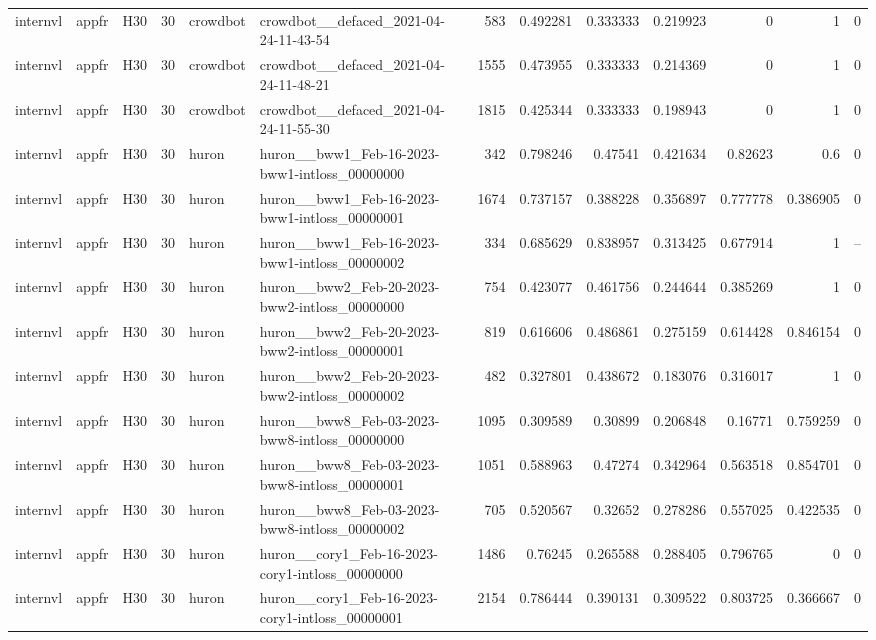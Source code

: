 \begin{longtable}{lllrllrrrrrrr}
internvl & appfr & H30 & 30 & crowdbot & crowdbot\_\_defaced\_2021-04-24-11-43-54 & 583 & 0.492281 & 0.333333 & 0.219923 & 0 & 1 & 0 \\
internvl & appfr & H30 & 30 & crowdbot & crowdbot\_\_defaced\_2021-04-24-11-48-21 & 1555 & 0.473955 & 0.333333 & 0.214369 & 0 & 1 & 0 \\
internvl & appfr & H30 & 30 & crowdbot & crowdbot\_\_defaced\_2021-04-24-11-55-30 & 1815 & 0.425344 & 0.333333 & 0.198943 & 0 & 1 & 0 \\
internvl & appfr & H30 & 30 & huron & huron\_\_bww1\_Feb-16-2023-bww1-intloss\_00000000 & 342 & 0.798246 & 0.47541 & 0.421634 & 0.82623 & 0.6 & 0 \\
internvl & appfr & H30 & 30 & huron & huron\_\_bww1\_Feb-16-2023-bww1-intloss\_00000001 & 1674 & 0.737157 & 0.388228 & 0.356897 & 0.777778 & 0.386905 & 0 \\
internvl & appfr & H30 & 30 & huron & huron\_\_bww1\_Feb-16-2023-bww1-intloss\_00000002 & 334 & 0.685629 & 0.838957 & 0.313425 & 0.677914 & 1 & -- \\
internvl & appfr & H30 & 30 & huron & huron\_\_bww2\_Feb-20-2023-bww2-intloss\_00000000 & 754 & 0.423077 & 0.461756 & 0.244644 & 0.385269 & 1 & 0 \\
internvl & appfr & H30 & 30 & huron & huron\_\_bww2\_Feb-20-2023-bww2-intloss\_00000001 & 819 & 0.616606 & 0.486861 & 0.275159 & 0.614428 & 0.846154 & 0 \\
internvl & appfr & H30 & 30 & huron & huron\_\_bww2\_Feb-20-2023-bww2-intloss\_00000002 & 482 & 0.327801 & 0.438672 & 0.183076 & 0.316017 & 1 & 0 \\
internvl & appfr & H30 & 30 & huron & huron\_\_bww8\_Feb-03-2023-bww8-intloss\_00000000 & 1095 & 0.309589 & 0.30899 & 0.206848 & 0.16771 & 0.759259 & 0 \\
internvl & appfr & H30 & 30 & huron & huron\_\_bww8\_Feb-03-2023-bww8-intloss\_00000001 & 1051 & 0.588963 & 0.47274 & 0.342964 & 0.563518 & 0.854701 & 0 \\
internvl & appfr & H30 & 30 & huron & huron\_\_bww8\_Feb-03-2023-bww8-intloss\_00000002 & 705 & 0.520567 & 0.32652 & 0.278286 & 0.557025 & 0.422535 & 0 \\
internvl & appfr & H30 & 30 & huron & huron\_\_cory1\_Feb-16-2023-cory1-intloss\_00000000 & 1486 & 0.76245 & 0.265588 & 0.288405 & 0.796765 & 0 & 0 \\
internvl & appfr & H30 & 30 & huron & huron\_\_cory1\_Feb-16-2023-cory1-intloss\_00000001 & 2154 & 0.786444 & 0.390131 & 0.309522 & 0.803725 & 0.366667 & 0 \\

\end{longtable}

